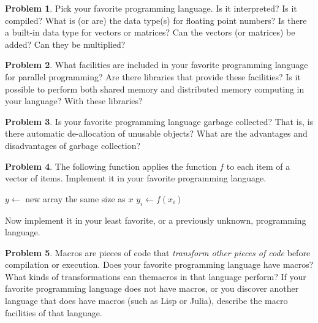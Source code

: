 \documentclass{article}
\theoremstyle{definition}
\newtheorem{problem}{Problem}[subsection]
\newcommand{\courier}[1]{{\fontfamily{pcr}\selectfont#1}}
\begin{document}
	\setcounter{section}{1}
	\setcounter{subsection}{2}
	
	\setcounter{problem}{0}
	\begin{problem}
	Pick your favorite programming language. Is it interpreted? Is it compiled? What
	is (or are) the data type(s) for floating point numbers? Is there a built-in data
	type for vectors or matrices? Can the vectors (or matrices) be added? Can they
	be multiplied?
	\end{problem}
	
	\newpage
	\setcounter{problem}{1}
	\begin{problem}
	What facilities are included in your favorite programming language for parallel
	programming? Are there libraries that provide these facilities? Is it possible
	to perform both shared memory and distributed memory computing in your
	language? With these libraries?
	\end{problem}
	
	\newpage
	\setcounter{problem}{2}
	\begin{problem}
		Is your favorite programming language garbage collected? That is, is there automatic de-allocation of unusable objects? What are the advantages and disadvantages
		of garbage collection?
	\end{problem}
	
	\newpage
	\setcounter{problem}{3}
	\begin{problem}
		The following function applies the function \(f\) to each item of a vector of items. Implement it in your favorite programming language.
		\begin{figure*}[h!]
			\begin{algorithmic}
				\State \(y \gets \)\courier{ new array the same size as }\(x\)
				\For{\(i\) \courier{an index of }\(x\)}
					\State \(y_i\gets f(x_i)\)
				\EndFor
				\EndFunction
			\end{algorithmic}
		\end{figure*}
	
	
		Now implement it in your least favorite, or a previously unknown, programming
		language.
	\end{problem}
	
	\newpage
	\setcounter{problem}{4}
	\begin{problem}
	Macros are pieces of code that \textit{transform other pieces of code} before compilation or execution. Does your favorite programming language have macros? What
	kinds of transformations can themacros in that language perform? If your favorite
	programming language does not have macros, or you discover another language
	that does have macros (such as Lisp or Julia), describe the macro facilities of
	that language.
	\end{problem}
	
\end{document}
